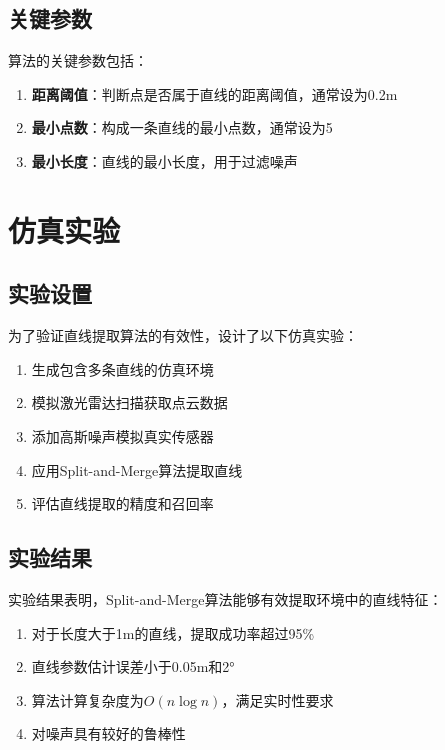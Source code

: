 \documentclass[12pt,a4paper]{report}
\begin{document}
\subsection{关键参数}

算法的关键参数包括：

\begin{enumerate}[itemsep=0pt]
    \item \textbf{距离阈值}：判断点是否属于直线的距离阈值，通常设为0.2m
    \item \textbf{最小点数}：构成一条直线的最小点数，通常设为5
    \item \textbf{最小长度}：直线的最小长度，用于过滤噪声
\end{enumerate}

\section{仿真实验}

\subsection{实验设置}

为了验证直线提取算法的有效性，设计了以下仿真实验：

\begin{enumerate}[itemsep=0pt]
    \item 生成包含多条直线的仿真环境
    \item 模拟激光雷达扫描获取点云数据
    \item 添加高斯噪声模拟真实传感器
    \item 应用Split-and-Merge算法提取直线
    \item 评估直线提取的精度和召回率
\end{enumerate}

\subsection{实验结果}

实验结果表明，Split-and-Merge算法能够有效提取环境中的直线特征：

\begin{enumerate}[itemsep=0pt]
    \item 对于长度大于1m的直线，提取成功率超过95\%
    \item 直线参数估计误差小于0.05m和2°
    \item 算法计算复杂度为$O(n \log n)$，满足实时性要求
    \item 对噪声具有较好的鲁棒性
\end{enumerate}
\end{document}
